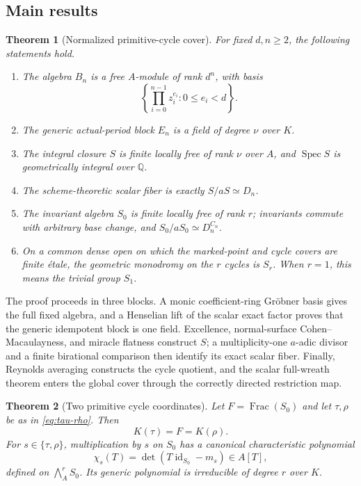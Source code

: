 \documentclass[11pt]{article}
\newtheorem{theorem}{Theorem}[section]
\theoremstyle{definition}
\theoremstyle{remark}
\newcommand{\Q}{\mathbb{Q}}
\newcommand{\Spec}{\operatorname{Spec}}
\newcommand{\Frac}{\operatorname{Frac}}
\newcommand{\id}{\operatorname{id}}
\newcommand{\etale}{\'{e}tale}
\begin{document}
\subsection{Main results}

\begin{theorem}[Normalized primitive-cycle cover]\label{thm:A}
For fixed $d,n\geq2$, the following statements hold.
\begin{enumerate}[label=\textup{(\arabic*)}]
\item The algebra $B_n$ is a free $A$-module of rank $d^n$, with basis
\[
 \left\{\prod_{i=0}^{n-1}z_i^{e_i}:0\leq e_i<d\right\}.
\]
\item The generic actual-period block $E_n$ is a field of degree $\nu$ over
  $K$.
\item The integral closure $S$ is finite locally free of rank $\nu$ over
  $A$, and $\Spec S$ is geometrically integral over $\Q$.
\item The scheme-theoretic scalar fiber is exactly
  $S/aS\simeq D_n$.
\item The invariant algebra $S_0$ is finite locally free of rank $r$;
  invariants commute with arbitrary base change, and
  $S_0/aS_0\simeq D_n^{C_n}$.
\item On a common dense open on which the marked-point and cycle covers are
  finite \etale, the geometric monodromy on the $r$ cycles is $S_r$.
  When $r=1$, this means the trivial group $S_1$.
\end{enumerate}
\end{theorem}

The proof proceeds in three blocks.  A monic coefficient-ring Gr\"obner
basis gives the full fixed algebra, and a Henselian lift of the scalar exact
factor proves that the generic idempotent block is one field.  Excellence,
normal-surface Cohen--Macaulayness, and miracle flatness construct $S$; a
multiplicity-one $a$-adic divisor and a finite birational comparison then
identify its exact scalar fiber.  Finally, Reynolds averaging constructs the
cycle quotient, and the scalar full-wreath theorem enters the global cover
through the correctly directed restriction map.

\begin{theorem}[Two primitive cycle coordinates]\label{thm:B}
Let $F=\Frac(S_0)$ and let $\tau,\rho$ be as in
\eqref{eq:tau-rho}.  Then
\[
 K(\tau)=F=K(\rho).
\]
For $s\in\{\tau,\rho\}$, multiplication by $s$ on $S_0$ has a canonical
characteristic polynomial
\[
 \chi_s(T)=\det(T\id_{S_0}-m_s)\in A[T],
\]
defined on $\bigwedge_A^rS_0$.  Its generic polynomial is irreducible of
degree $r$ over $K$.
\end{theorem}
\end{document}
